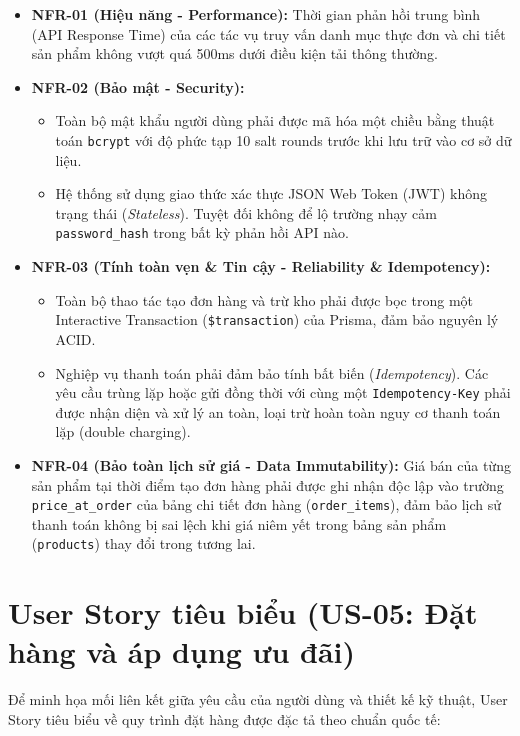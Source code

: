 \begin{itemize}
    \item \textbf{NFR-01 (Hiệu năng - Performance):} Thời gian phản hồi trung bình (API Response Time) của các tác vụ truy vấn danh mục thực đơn và chi tiết sản phẩm không vượt quá 500ms dưới điều kiện tải thông thường.
    \item \textbf{NFR-02 (Bảo mật - Security):} 
    \begin{itemize}
        \item Toàn bộ mật khẩu người dùng phải được mã hóa một chiều bằng thuật toán \texttt{bcrypt} với độ phức tạp 10 salt rounds trước khi lưu trữ vào cơ sở dữ liệu.
        \item Hệ thống sử dụng giao thức xác thực JSON Web Token (JWT) không trạng thái (\textit{Stateless}). Tuyệt đối không để lộ trường nhạy cảm \texttt{password\_hash} trong bất kỳ phản hồi API nào.
    \end{itemize}
    \item \textbf{NFR-03 (Tính toàn vẹn \& Tin cậy - Reliability \& Idempotency):}
    \begin{itemize}
        \item Toàn bộ thao tác tạo đơn hàng và trừ kho phải được bọc trong một Interactive Transaction (\texttt{\$transaction}) của Prisma, đảm bảo nguyên lý ACID.
        \item Nghiệp vụ thanh toán phải đảm bảo tính bất biến (\textit{Idempotency}). Các yêu cầu trùng lặp hoặc gửi đồng thời với cùng một \texttt{Idempotency-Key} phải được nhận diện và xử lý an toàn, loại trừ hoàn toàn nguy cơ thanh toán lặp (double charging).
    \end{itemize}
    \item \textbf{NFR-04 (Bảo toàn lịch sử giá - Data Immutability):} Giá bán của từng sản phẩm tại thời điểm tạo đơn hàng phải được ghi nhận độc lập vào trường \texttt{price\_at\_order} của bảng chi tiết đơn hàng (\texttt{order\_items}), đảm bảo lịch sử thanh toán không bị sai lệch khi giá niêm yết trong bảng sản phẩm (\texttt{products}) thay đổi trong tương lai.
\end{itemize}

\section{User Story tiêu biểu (US-05: Đặt hàng và áp dụng ưu đãi)}
Để minh họa mối liên kết giữa yêu cầu của người dùng và thiết kế kỹ thuật, User Story tiêu biểu về quy trình đặt hàng được đặc tả theo chuẩn quốc tế:

